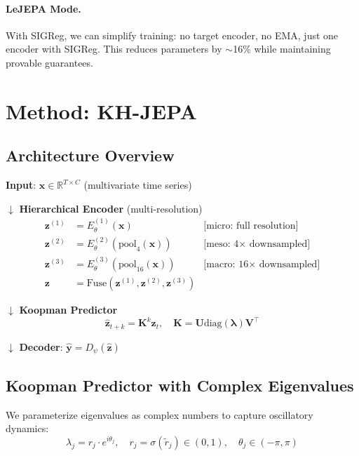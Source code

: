 \documentclass{article}
\begin{document}
\paragraph{LeJEPA Mode.} With SIGReg, we can simplify training: no target encoder, no EMA, just one encoder with SIGReg. This reduces parameters by $\sim$16\% while maintaining provable guarantees.

\section{Method: KH-JEPA}

\subsection{Architecture Overview}

\textbf{Input}: $\mathbf{x} \in \mathbb{R}^{T \times C}$ (multivariate time series)

\noindent$\downarrow$ \textbf{Hierarchical Encoder} (multi-resolution)
\begin{align*}
\mathbf{z}^{(1)} &= E_\theta^{(1)}(\mathbf{x}) & \text{[micro: full resolution]} \\
\mathbf{z}^{(2)} &= E_\theta^{(2)}(\text{pool}_4(\mathbf{x})) & \text{[meso: 4$\times$ downsampled]} \\
\mathbf{z}^{(3)} &= E_\theta^{(3)}(\text{pool}_{16}(\mathbf{x})) & \text{[macro: 16$\times$ downsampled]} \\
\mathbf{z} &= \text{Fuse}(\mathbf{z}^{(1)}, \mathbf{z}^{(2)}, \mathbf{z}^{(3)})
\end{align*}

\noindent$\downarrow$ \textbf{Koopman Predictor}
\begin{equation}
\hat{\mathbf{z}}_{t+k} = \mathbf{K}^k \mathbf{z}_t, \quad \mathbf{K} = \mathbf{U} \text{diag}(\boldsymbol{\lambda}) \mathbf{V}^\top
\end{equation}

\noindent$\downarrow$ \textbf{Decoder}: $\hat{\mathbf{y}} = D_\psi(\hat{\mathbf{z}})$

\subsection{Koopman Predictor with Complex Eigenvalues}

We parameterize eigenvalues as complex numbers to capture oscillatory dynamics:
\begin{equation}
    \lambda_j = r_j \cdot e^{i\theta_j}, \quad r_j = \sigma(\tilde{r}_j) \in (0, 1), \quad \theta_j \in (-\pi, \pi)
\end{equation}
\end{document}

